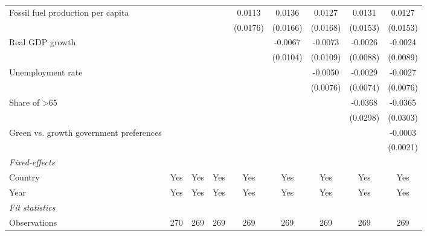 \begin{table}[htbp]
\begin{tabular}{lcccccccc}
      Fossil fuel production per capita               &                 &                 &          & 0.0113   & 0.0136   & 0.0127   & 0.0131   & 0.0127\\   
                                                      &                 &                 &          & (0.0176) & (0.0166) & (0.0168) & (0.0153) & (0.0153)\\   
      Real GDP growth                                 &                 &                 &          &          & -0.0067  & -0.0073  & -0.0026  & -0.0024\\   
                                                      &                 &                 &          &          & (0.0104) & (0.0109) & (0.0088) & (0.0089)\\   
      Unemployment rate                               &                 &                 &          &          &          & -0.0050  & -0.0029  & -0.0027\\   
                                                      &                 &                 &          &          &          & (0.0076) & (0.0074) & (0.0076)\\   
      Share of >65                                    &                 &                 &          &          &          &          & -0.0368  & -0.0365\\   
                                                      &                 &                 &          &          &          &          & (0.0298) & (0.0303)\\   
      Green vs. growth government preferences         &                 &                 &          &          &          &          &          & -0.0003\\   
                                                      &                 &                 &          &          &          &          &          & (0.0021)\\   
      \midrule
      \emph{Fixed-effects}\\
      Country                                         & Yes             & Yes             & Yes      & Yes      & Yes      & Yes      & Yes      & Yes\\  
      Year                                            & Yes             & Yes             & Yes      & Yes      & Yes      & Yes      & Yes      & Yes\\  
      \midrule
      \emph{Fit statistics}\\
      Observations                                    & 270             & 269             & 269      & 269      & 269      & 269      & 269      & 269\\  

\end{tabular}
\end{table}
